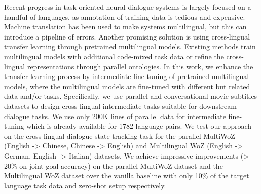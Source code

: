 Recent progress in task-oriented neural dialogue systems is largely focused on a handful of languages, as annotation of training data is tedious and expensive.  Machine translation has been used to make systems multilingual, but this can introduce a pipeline of errors. Another promising solution is using cross-lingual transfer learning through pretrained multilingual models. Existing methods train multilingual models with additional code-mixed task data or refine the cross-lingual representations through parallel ontologies. In this work, we enhance the transfer learning process by intermediate fine-tuning of pretrained multilingual models, where the multilingual models are fine-tuned with different but related data and/or tasks. Specifically, we use parallel and conversational movie subtitles datasets to design cross-lingual intermediate tasks suitable for downstream dialogue tasks. We use only 200K lines of parallel data for intermediate fine-tuning which is already available for 1782 language pairs. We test our approach on the cross-lingual dialogue state tracking task for the parallel MultiWoZ (English -> Chinese, Chinese -> English) and Multilingual WoZ (English -> German, English -> Italian) datasets. We achieve impressive improvements (> 20\% on joint goal accuracy) on the parallel MultiWoZ dataset and the  Multilingual WoZ dataset over the vanilla baseline with only 10\% of the target language task data and zero-shot setup respectively.
